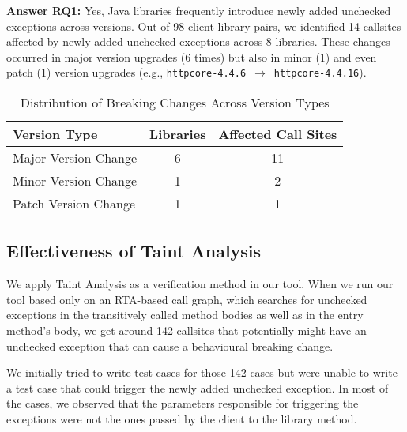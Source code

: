 \vspace{1em}
\begin{tcolorbox}[colback=gray!10, colframe=black]
\textbf{Answer RQ1:} Yes, Java libraries frequently introduce newly added unchecked exceptions across versions. Out of 98 client-library pairs, we identified 14 callsites affected by newly added unchecked exceptions across 8 libraries. These changes occurred in major version upgrades (6 times) but also in minor (1) and even patch (1) version upgrades (e.g., \texttt{httpcore-4.4.6}~$\rightarrow$~\texttt{httpcore-4.4.16}).
\end{tcolorbox}
\vspace{1em}

\begin{table}[h]
\centering
\caption{Distribution of Breaking Changes Across Version Types}
\label{tab:version-distribution}
\begin{tabular}{lcc}
\toprule
\textbf{Version Type} & \textbf{Libraries} & \textbf{Affected Call Sites} \\
\midrule
Major Version Change & 6 & 11 \\
Minor Version Change & 1 & 2 \\
Patch Version Change & 1 & 1 \\
\bottomrule
\end{tabular}
\end{table}

\subsection{Effectiveness of Taint Analysis}

We apply Taint Analysis as a verification method in our tool. When we run our tool based only on an RTA-based call graph, which
searches for unchecked exceptions in the transitively called method bodies as well as in the entry method's body, we get around 
142 callsites that potentially might have an unchecked exception that can cause a behavioural breaking change.

We initially tried to write test cases for those 142 cases but were unable to write a test case that could trigger
the newly added unchecked exception. In most of the cases, we observed that the parameters responsible for triggering the 
exceptions were not the ones passed by the client to the library method.

